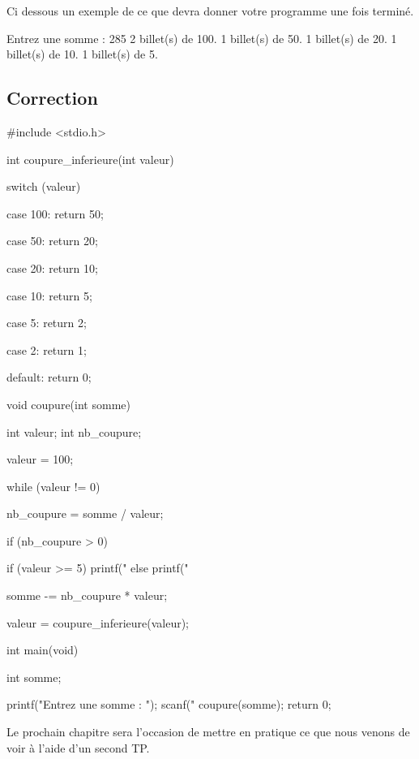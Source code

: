 Ci dessous un exemple de ce que devra donner votre programme une fois
terminé.

\begin{C}
Entrez une somme : 285
2 billet(s) de 100.
1 billet(s) de 50.
1 billet(s) de 20.
1 billet(s) de 10.
1 billet(s) de 5.
\end{C}

\subsection{Correction}
\label{correction-12}

\begin{C}
 #include <stdio.h>


int coupure_inferieure(int valeur)
{
    switch (valeur)
    {
    case 100:
        return 50;
    
    case 50:
        return 20;
    
    case 20:
        return 10;
    
    case 10:
        return 5;
    
    case 5:
        return 2;
    
    case 2:
        return 1;
    
    default:
        return 0;
    }
}


void coupure(int somme)
{
    int valeur;
    int nb_coupure;

    valeur = 100;

    while (valeur != 0)
    {
        nb_coupure = somme / valeur;
        
        if (nb_coupure > 0)
        {
            if (valeur >= 5)
                printf("%
            else
                printf("%

            somme -= nb_coupure * valeur;
        }

        valeur = coupure_inferieure(valeur);
    }
}


int main(void)
{
    int somme;

    printf("Entrez une somme : ");
    scanf("%
    coupure(somme);
    return 0;
}
\end{C}

\hrulefill

Le prochain chapitre sera l'occasion de mettre en
pratique ce que nous venons de voir à l'aide d'un second TP.